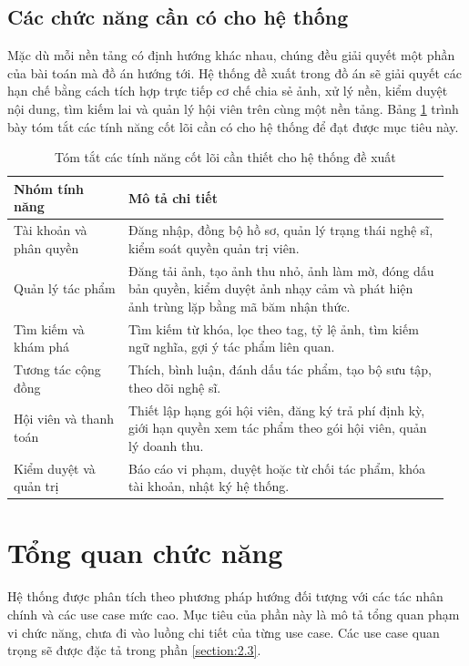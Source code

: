 \subsection{Các chức năng cần có cho hệ thống}
\label{subsection:2.1.2}
Mặc dù mỗi nền tảng có định hướng khác nhau, chúng đều giải quyết một phần của bài toán mà đồ án hướng tới. Hệ thống đề xuất trong đồ án sẽ giải quyết các hạn chế bằng cách tích hợp trực tiếp cơ chế chia sẻ ảnh, xử lý nền, kiểm duyệt nội dung, tìm kiếm lai và quản lý hội viên trên cùng một nền tảng. Bảng \ref{table:2_1} trình bày tóm tắt các tính năng cốt lõi cần có cho hệ thống để đạt được mục tiêu này.

\begin{table}[h!]
    \caption{Tóm tắt các tính năng cốt lõi cần thiết cho hệ thống đề xuất}
    \label{table:2_1}
\centering
\small
\renewcommand{\arraystretch}{1.25}
\begin{tabular}{|p{0.25\linewidth}|p{0.70\linewidth}|}
\hline
\textbf{Nhóm tính năng} & \textbf{Mô tả chi tiết} \\
\hline
Tài khoản và phân quyền & Đăng nhập, đồng bộ hồ sơ, quản lý trạng thái nghệ sĩ, kiểm soát quyền quản trị viên. \\
\hline
Quản lý tác phẩm & Đăng tải ảnh, tạo ảnh thu nhỏ, ảnh làm mờ, đóng dấu bản quyền, kiểm duyệt ảnh nhạy cảm và phát hiện ảnh trùng lặp bằng mã băm nhận thức. \\
\hline
Tìm kiếm và khám phá & Tìm kiếm từ khóa, lọc theo tag, tỷ lệ ảnh, tìm kiếm ngữ nghĩa, gợi ý tác phẩm liên quan. \\
\hline
Tương tác cộng đồng & Thích, bình luận, đánh dấu tác phẩm, tạo bộ sưu tập, theo dõi nghệ sĩ. \\
\hline
Hội viên và thanh toán & Thiết lập hạng gói hội viên, đăng ký trả phí định kỳ, giới hạn quyền xem tác phẩm theo gói hội viên, quản lý doanh thu. \\
\hline
Kiểm duyệt và quản trị & Báo cáo vi phạm, duyệt hoặc từ chối tác phẩm, khóa tài khoản, nhật ký hệ thống. \\
\hline
\end{tabular}
\end{table}
\FloatBarrier

\section{Tổng quan chức năng}
\label{section:2.2}

Hệ thống được phân tích theo phương pháp hướng đối tượng với các tác nhân chính và các use case mức cao. Mục tiêu của phần này là mô tả tổng quan phạm vi chức năng, chưa đi vào luồng chi tiết của từng use case. Các use case quan trọng sẽ được đặc tả trong phần \ref{section:2.3}.

